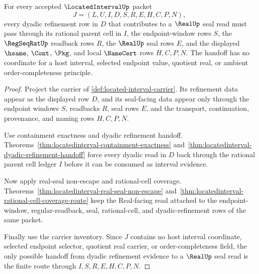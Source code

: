 \begin{theorem}
\label{thm:locatedinterval-dyadic-real-seal-handoff}
For every accepted $\LocatedIntervalUp$ packet
$$
J=(L,U,I,D,S,R,E,H,C,P,N),
$$
every dyadic refinement row in $D$ that contributes to a $\RealUp$ seal read must pass through its rational parent cell in $I$, the endpoint-window rows $S$, the $\RegSeqRatUp$ readback rows $R$, the $\RealUp$ seal rows $E$, and the displayed $\hsame$, $\Cont$, $\Pkg$, and local $\NameCert$ rows $H,C,P,N$. The handoff has no coordinate for a host interval, selected endpoint value, quotient real, or ambient order-completeness principle.
\end{theorem}
\begin{proof}
Project the carrier of \autoref{def:located-interval-carrier}. Its refinement data appear as the displayed row $D$, and its seal-facing data appear only through the endpoint windows $S$, readbacks $R$, seal rows $E$, and the transport, continuation, provenance, and naming rows $H,C,P,N$.

Use containment exactness and dyadic refinement handoff. Theorems~\ref{thm:locatedinterval-containment-exactness} and~\ref{thm:locatedinterval-dyadic-refinement-handoff} force every dyadic read in $D$ back through the rational parent cell ledger $I$ before it can be consumed as interval evidence.

Now apply real-seal non-escape and rational-cell coverage. Theorems~\ref{thm:locatedinterval-real-seal-non-escape} and~\ref{thm:locatedinterval-rational-cell-coverage-route} keep the Real-facing read attached to the endpoint-window, regular-readback, seal, rational-cell, and dyadic-refinement rows of the same packet.

Finally use the carrier inventory. Since $J$ contains no host interval coordinate, selected endpoint selector, quotient real carrier, or order-completeness field, the only possible handoff from dyadic refinement evidence to a $\RealUp$ seal read is the finite route through $I,S,R,E,H,C,P,N$.
\end{proof}

